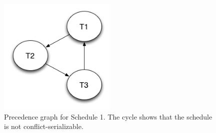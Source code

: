 \begin{figure}[h!]
  \centering
  \includegraphics[width=0.5\textwidth]{images/schedule1}
  \caption{Precedence graph for Schedule 1. The cycle shows that the schedule is
  not conflict-serializable.}
  \label{fig:schedule1}
\end{figure}
